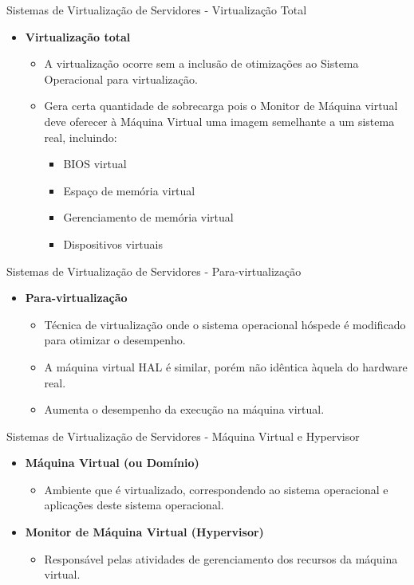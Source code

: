 \documentclass{beamer}
\begin{document}
\begin{frame}{Sistemas de Virtualização de Servidores - Virtualização Total}
    \begin{itemize}
        \item \textbf{Virtualização total}
        \begin{itemize}
            \item A virtualização ocorre sem a inclusão de otimizações ao Sistema Operacional para virtualização.
            \item Gera certa quantidade de sobrecarga pois o Monitor de Máquina virtual deve oferecer à Máquina Virtual uma imagem semelhante a um sistema real, incluindo:
            \begin{itemize}
                \item BIOS virtual
                \item Espaço de memória virtual
                \item Gerenciamento de memória virtual
                \item Dispositivos virtuais
            \end{itemize}
        \end{itemize}
    \end{itemize}
\end{frame}
\begin{frame}{Sistemas de Virtualização de Servidores - Para-virtualização}
    \begin{itemize}
        \item \textbf{Para-virtualização}
        \begin{itemize}
            \item Técnica de virtualização onde o sistema operacional hóspede é modificado para otimizar o desempenho.
            \item A máquina virtual HAL é similar, porém não idêntica àquela do hardware real.
            \item Aumenta o desempenho da execução na máquina virtual.
        \end{itemize}
    \end{itemize}
\end{frame}
\begin{frame}{Sistemas de Virtualização de Servidores - Máquina Virtual e Hypervisor}
    \begin{itemize}
        \item \textbf{Máquina Virtual (ou Domínio)}
        \begin{itemize}
            \item Ambiente que é virtualizado, correspondendo ao sistema operacional e aplicações deste sistema operacional.
        \end{itemize}
        
        \item \textbf{Monitor de Máquina Virtual (Hypervisor)}
        \begin{itemize}
            \item Responsável pelas atividades de gerenciamento dos recursos da máquina virtual.
        \end{itemize}
    \end{itemize}
\end{frame}
\end{document}

